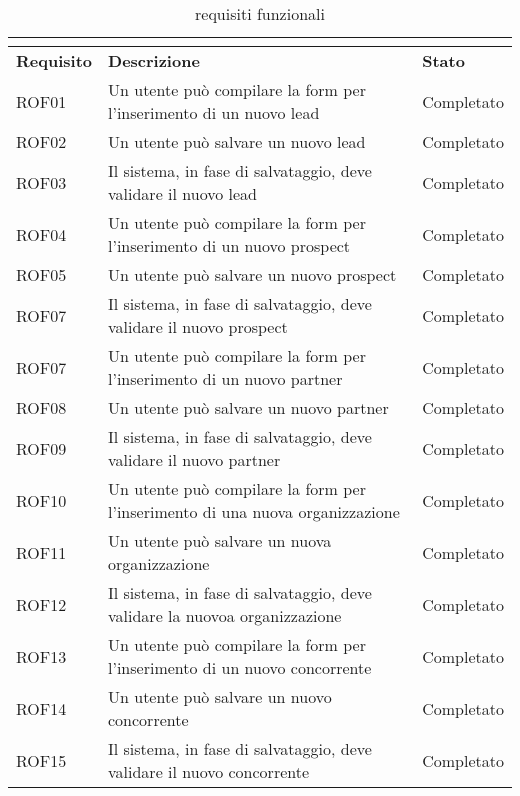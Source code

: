 \begin{longtable}[H]{|p{3cm}|p{8cm}|p{3cm}|}
	\caption{requisiti funzionali}\\
	\label{tab:requisiti-funzionali}\\
	\hline
	\rule[-4mm]{0mm}{1cm}	
	\textbf{Requisito} & \textbf{Descrizione} & \textbf{Stato}\\
	\hline
	\rule[-3mm]{0mm}{0.8cm}	
	ROF01&Un utente può compilare la form per l'inserimento di un nuovo lead&Completato\\
	\hline
	\rule[-3mm]{0mm}{0.8cm}
	ROF02&Un utente può salvare un nuovo lead&Completato\\
	\hline
	\rule[-3mm]{0mm}{0.8cm}
	ROF03&Il sistema, in fase di salvataggio, deve validare il nuovo lead &Completato\\
	\hline
	\rule[-3mm]{0mm}{0.8cm}
	ROF04&Un utente può compilare la form per l'inserimento di un nuovo prospect &Completato\\
	\hline
	\rule[-3mm]{0mm}{0.8cm}
	ROF05&Un utente può salvare un nuovo prospect&Completato\\
	\hline
	\rule[-3mm]{0mm}{0.8cm}
	ROF07&Il sistema, in fase di salvataggio, deve validare il nuovo prospect&Completato \\
	\hline
	\rule[-3mm]{0mm}{0.8cm}
	ROF07&Un utente può compilare la form per l'inserimento di un nuovo partner  & Completato\\
	\hline
	\rule[-3mm]{0mm}{0.8cm}
	ROF08&Un utente può salvare un nuovo partner&Completato\\
	\hline
	\rule[-3mm]{0mm}{0.8cm}
	ROF09&Il sistema, in fase di salvataggio, deve validare il nuovo partner&Completato \\
	\hline
	\rule[-3mm]{0mm}{0.8cm}
	ROF10&Un utente può compilare la form per l'inserimento di una nuova organizzazione  & Completato\\
	\hline
	\rule[-3mm]{0mm}{0.8cm}
	ROF11&Un utente può salvare un nuova organizzazione&Completato\\
	\hline
	\rule[-3mm]{0mm}{0.8cm}
	ROF12&Il sistema, in fase di salvataggio, deve validare la nuovoa organizzazione&Completato \\
	\hline
	\rule[-3mm]{0mm}{0.8cm}
	ROF13&Un utente può compilare la form per l'inserimento di un nuovo concorrente  & Completato\\
	\hline
	\rule[-3mm]{0mm}{0.8cm}
	ROF14&Un utente può salvare un nuovo concorrente&Completato\\
	\hline
	\rule[-3mm]{0mm}{0.8cm}
	ROF15&Il sistema, in fase di salvataggio, deve validare il nuovo concorrente&Completato \\

\end{longtable}
